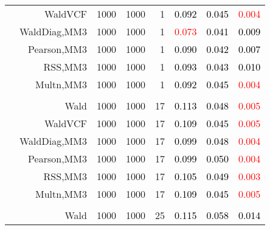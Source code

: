 \documentclass[
]{article}
\begin{document}
\begin{table}[H]
{\begin{tabular}[t]{lrrrrrrr}
\hspace{1em} & WaldVCF & 1000 & 1000 & 1 & \textcolor{black}{0.092} & \textcolor{black}{0.045} & \textcolor{red}{0.004}\\

\hspace{1em} & WaldDiag,MM3 & 1000 & 1000 & 1 & \textcolor{red}{0.073} & \textcolor{black}{0.041} & \textcolor{black}{0.009}\\

\hspace{1em} & Pearson,MM3 & 1000 & 1000 & 1 & \textcolor{black}{0.090} & \textcolor{black}{0.042} & \textcolor{black}{0.007}\\

\hspace{1em} & RSS,MM3 & 1000 & 1000 & 1 & \textcolor{black}{0.093} & \textcolor{black}{0.043} & \textcolor{black}{0.010}\\

\hspace{1em} & Multn,MM3 & 1000 & 1000 & 1 & \textcolor{black}{0.092} & \textcolor{black}{0.045} & \textcolor{red}{0.004}\\
\cmidrule{1-8}
\addlinespace[0.3em]
\multicolumn{8}{l}{\textbf{1F 15V}}\\
\hspace{1em} & Wald & 1000 & 1000 & 17 & \textcolor{black}{0.113} & \textcolor{black}{0.048} & \textcolor{red}{0.005}\\

\hspace{1em} & WaldVCF & 1000 & 1000 & 17 & \textcolor{black}{0.109} & \textcolor{black}{0.045} & \textcolor{red}{0.005}\\

\hspace{1em} & WaldDiag,MM3 & 1000 & 1000 & 17 & \textcolor{black}{0.099} & \textcolor{black}{0.048} & \textcolor{red}{0.004}\\

\hspace{1em} & Pearson,MM3 & 1000 & 1000 & 17 & \textcolor{black}{0.099} & \textcolor{black}{0.050} & \textcolor{red}{0.004}\\

\hspace{1em} & RSS,MM3 & 1000 & 1000 & 17 & \textcolor{black}{0.105} & \textcolor{black}{0.049} & \textcolor{red}{0.003}\\

\hspace{1em} & Multn,MM3 & 1000 & 1000 & 17 & \textcolor{black}{0.109} & \textcolor{black}{0.045} & \textcolor{red}{0.005}\\
\cmidrule{1-8}
\addlinespace[0.3em]
\multicolumn{8}{l}{\textbf{2F 10V}}\\
\hspace{1em} & Wald & 1000 & 1000 & 25 & \textcolor{black}{0.115} & \textcolor{black}{0.058} & \textcolor{black}{0.014}\\


\end{tabular}}
\end{table}
\end{document}
